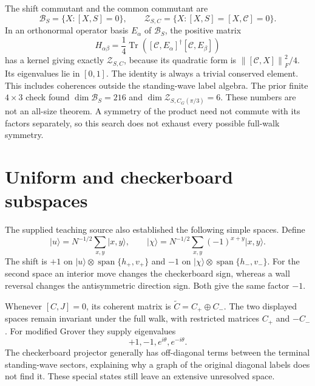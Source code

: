 \documentclass[11pt,a4paper,oneside]{report}
\newcommand{\ket}[1]{\lvert #1\rangle}
\newcommand{\CC}{\mathcal C}
\newcommand{\Tr}{\operatorname{Tr}}
\newcommand{\spanof}{\operatorname{span}}
\newcommand{\norm}[1]{\left\lVert#1\right\rVert}
\numberwithin{equation}{chapter}
\begin{document}
The shift commutant and the common commutant are
\begin{equation}
\mathcal B_S=\{X:[X,S]=0\},\qquad
\mathcal Z_{S,C}=\{X:[X,S]=[X,\CC]=0\}.
\end{equation}
In an orthonormal operator basis \(E_\alpha\) of \(\mathcal B_S\),
the positive matrix
\begin{equation}
H_{\alpha\beta}=\frac14\Tr\left(
[\CC,E_\alpha]^\dagger[\CC,E_\beta]\right)
\end{equation}
has a kernel giving exactly \(\mathcal Z_{S,C}\), because its
quadratic form is \(\norm{[\CC,X]}_F^2/4\). Its eigenvalues lie in
\([0,1]\). The identity is always a trivial conserved element.
This includes coherences outside the standing-wave label algebra.
The prior finite \(4\times3\) check found
\(\dim\mathcal B_S=216\) and
\(\dim\mathcal Z_{S,C_G(\pi/3)}=6\).
These numbers are not an all-size theorem. A symmetry of the product
need not commute with its factors separately, so this search does
not exhaust every possible full-walk symmetry.

\section{Uniform and checkerboard subspaces}

The supplied teaching source also established the following simple
spaces. Define
\begin{equation}
\ket u=N^{-1/2}\sum_{x,y}\ket{x,y},\qquad
\ket\chi=N^{-1/2}\sum_{x,y}(-1)^{x+y}\ket{x,y}.
\end{equation}
The shift is \(+1\) on
\(\ket u\otimes\spanof\{h_+,v_+\}\) and \(-1\) on
\(\ket\chi\otimes\spanof\{h_-,v_-\}\).
For the second space an interior move changes the checkerboard sign,
whereas a wall reversal changes the antisymmetric direction sign.
Both give the same factor \(-1\).

Whenever \([C,J]=0\), its coherent matrix is
\(\widetilde C=C_+\oplus C_-\). The two displayed spaces remain
invariant under the full walk, with restricted matrices \(C_+\) and
\(-C_-\). For modified Grover they supply eigenvalues
\begin{equation}
\boxed{+1,-1,e^{i\theta},e^{-i\theta}.}
\end{equation}
The checkerboard projector generally has off-diagonal terms between
the terminal standing-wave sectors, explaining why a graph of the
original diagonal labels does not find it. These special states still
leave an extensive unresolved space.
\end{document}
